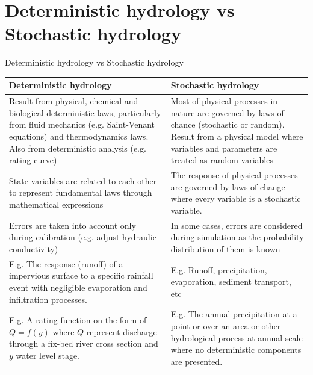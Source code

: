 \documentclass[8pt]{beamer}
\renewcommand{\emph}[1]{\textcolor{myorange}{#1}}
\begin{document}
\section{Deterministic hydrology vs Stochastic hydrology}
\begin{frame}{Deterministic hydrology vs Stochastic hydrology}
    
    \begin{tabular}{p{4.5cm}p{4.5cm}}  %
    \hline
    \alert{Deterministic hydrology} & \alert{Stochastic hydrology} \\
    \hline
    Result from physical, chemical and biological deterministic laws, particularly from fluid mechanics (e.g. Saint-Venant equations) and thermodynamics laws. Also from deterministic analysis (e.g. rating curve) & Most of physical processes in nature are governed by laws of chance (stochastic or random). Result from a physical model where variables and parameters are treated as random variables \\ \hline
    State variables are related to each other to represent fundamental laws through mathematical expressions & The response of physical processes are governed by laws of change where every variable is a stochastic variable. \\\hline
    Errors are taken into account only during calibration (e.g. adjust hydraulic conductivity) & In some cases, errors are considered during simulation as the \alert{probability distribution} of them is known \\ \hline
    \emph{E.g. The response (runoff) of a impervious surface to a specific rainfall event with negligible evaporation and infiltration processes.} & \emph{E.g. Runoff, precipitation, evaporation, sediment transport, etc} \\\hline
    \emph{E.g. A rating function on the form of $Q = f(y)$ where $Q$ represent discharge through a fix-bed river cross section and $y$ water level stage.} &  \emph{E.g. The annual precipitation at a point or over an area or other hydrological process at annual scale where no deterministic components are presented.}\\ \hline
    \end{tabular}
\end{frame}
\end{document}
